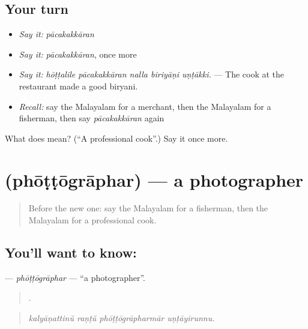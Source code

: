 \subsection*{Your turn}
\begin{itemize}
\raggedright
  \item \emph{Say it:} \emph{pācakakkāran}
  \item \emph{Say it:} \emph{pācakakkāran}, once more
  \item \emph{Say it:} \emph{hōṭṭalile pācakakkāran nalla biriyāṇi uṇṭākki.} — The cook at the restaurant made a good biryani.
  \item \emph{Recall:} say the Malayalam for a merchant, then the Malayalam for a fisherman, then say \emph{pācakakkāran} again
\end{itemize}

\begin{tcolorbox}[breakable,colback=teal!4,colframe=teal!35!black,title={Before you move on}]
What does  mean? (\textquotedblleft{}A professional cook\textquotedblright{}.) Say it once more.
\end{tcolorbox}
\section[\texorpdfstring{\ml{ഫോട്ടോഗ്രാഫർ} (phōṭṭōgrāphar)}{ഫോട്ടോഗ്രാഫർ (phōṭṭōgrāphar)}]{ (phōṭṭōgrāphar) — a photographer}

\label{lesson:ML-C548-phottographar}



\begin{quote}
Before the new one: say the Malayalam for a fisherman, then the Malayalam for a professional cook.
\end{quote}

\subsection*{You'll want to know: }
\textbf{} — \emph{phōṭṭōgrāphar} — \textquotedblleft{}a photographer\textquotedblright{}.

\begin{quote}
   .
\end{quote}

\begin{quote}
\emph{kalyāṇattinŭ raṇṭŭ phōṭṭōgrāpharmār uṇṭāyirunnu.}
\end{quote}


